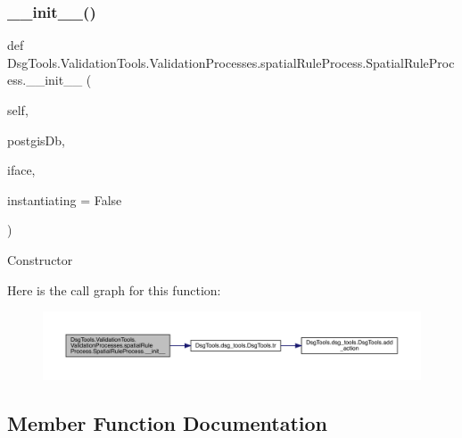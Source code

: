 \subsubsection{\texorpdfstring{\+\_\+\+\_\+init\+\_\+\+\_\+()}{\_\_init\_\_()}}
{\footnotesize\ttfamily def Dsg\+Tools.\+Validation\+Tools.\+Validation\+Processes.\+spatial\+Rule\+Process.\+Spatial\+Rule\+Process.\+\_\+\+\_\+init\+\_\+\+\_\+ (\begin{DoxyParamCaption}\item[{}]{self,  }\item[{}]{postgis\+Db,  }\item[{}]{iface,  }\item[{}]{instantiating = {\ttfamily False} }\end{DoxyParamCaption})}

\begin{DoxyVerb}Constructor
\end{DoxyVerb}
 Here is the call graph for this function\+:
\nopagebreak
\begin{figure}[H]
\begin{center}
\leavevmode
\includegraphics[width=350pt]{class_dsg_tools_1_1_validation_tools_1_1_validation_processes_1_1spatial_rule_process_1_1_spatial_rule_process_a72c86a634d8fbd1309d938c424d384cb_cgraph}
\end{center}
\end{figure}


\subsection{Member Function Documentation}
\mbox{\label{class_dsg_tools_1_1_validation_tools_1_1_validation_processes_1_1spatial_rule_process_1_1_spatial_rule_process_a766c38896529e992ec430782935ff72b}} 
